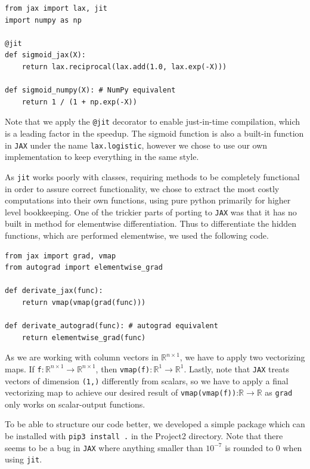 \documentclass{article}
\theoremstyle{definition}
\begin{document}
\begin{verbatim}
from jax import lax, jit
import numpy as np

@jit
def sigmoid_jax(X):
    return lax.reciprocal(lax.add(1.0, lax.exp(-X)))

def sigmoid_numpy(X): # NumPy equivalent
    return 1 / (1 + np.exp(-X))
\end{verbatim}

Note that we apply the \verb|@jit| decorator to enable just-in-time compilation, which is a leading factor in the speedup. The sigmoid function is also a built-in function in \verb|JAX| under the name \verb|lax.logistic|, however we chose to use our own implementation to keep everything in the same style.

As \verb|jit| works poorly with classes, requiring methods to be completely functional in order to assure correct functionality, we chose to extract the most costly computations into their own functions, using pure python primarily for higher level bookkeeping. One of the trickier parts of porting to \verb|JAX| was that it has no built in method for elementwise differentiation. Thus to differentiate the hidden functions, which are performed elementwise, we used the following code.

\begin{verbatim}
from jax import grad, vmap
from autograd import elementwise_grad

def derivate_jax(func):
    return vmap(vmap(grad(func)))

def derivate_autograd(func): # autograd equivalent
    return elementwise_grad(func)
\end{verbatim}

As we are working with column vectors in $\mathbb{R}^{n \times 1}$, we have to apply two vectorizing maps. If \verb|f|$: \mathbb{R}^{n \times 1} \to \mathbb{R}^{n \times 1}$, then \verb|vmap(f)|$: \mathbb{R}^{1} \to \mathbb{R}^{1}$. Lastly, note that \verb|JAX| treats vectors of dimension \verb|(1,)| differently from scalars, so we have to apply a final vectorizing map to achieve our desired result of \verb|vmap(vmap(f))|:$\mathbb{R} \to \mathbb{R}$ as \verb|grad| only works on scalar-output functions.

To be able to structure our code better, we developed a simple package which can be installed with \texttt{pip3 install .} in the Project2 directory. Note that there seems to be a bug in \verb|JAX| where anything smaller than $10^{-7}$ is rounded to $0$ when using \verb|jit|.
\end{document}
